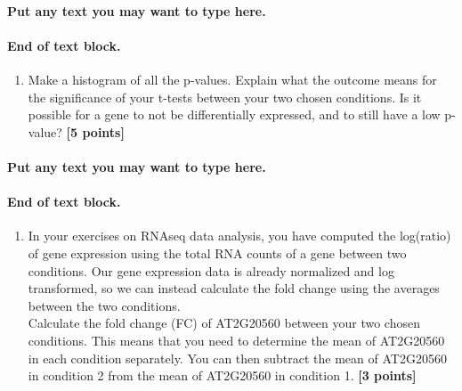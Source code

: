 \documentclass[
]{article}
\providecommand{\tightlist}{%
  \setlength{\itemsep}{0pt}\setlength{\parskip}{0pt}}
\begin{document}
\hypertarget{put-any-text-you-may-want-to-type-here.-6}{%
\paragraph{Put any text you may want to type
here.}\label{put-any-text-you-may-want-to-type-here.-6}}

\hypertarget{end-of-text-block.-8}{%
\paragraph{End of text block.}\label{end-of-text-block.-8}}

\begin{enumerate}
\def\labelenumi{\Alph{enumi})}
\setcounter{enumi}{2}
\tightlist
\item
  Make a histogram of all the p-values. Explain what the outcome means
  for the significance of your t-tests between your two chosen
  conditions. Is it possible for a gene to not be differentially
  expressed, and to still have a low p-value? \textbf{{[}5 points{]}}
\end{enumerate}

\hypertarget{put-any-text-you-may-want-to-type-here.-7}{%
\paragraph{Put any text you may want to type
here.}\label{put-any-text-you-may-want-to-type-here.-7}}

\hypertarget{end-of-text-block.-9}{%
\paragraph{End of text block.}\label{end-of-text-block.-9}}

\begin{enumerate}
\def\labelenumi{\Alph{enumi})}
\setcounter{enumi}{3}
\tightlist
\item
  In your exercises on RNAseq data analysis, you have computed the
  log(ratio) of gene expression using the total RNA counts of a gene
  between two conditions. Our gene expression data is already normalized
  and log transformed, so we can instead calculate the fold change using
  the averages between the two conditions.\\
  Calculate the fold change (FC) of AT2G20560 between your two chosen
  conditions. This means that you need to determine the mean of
  AT2G20560 in each condition separately. You can then subtract the mean
  of AT2G20560 in condition 2 from the mean of AT2G20560 in condition 1.
  \textbf{{[}3 points{]}}
\end{enumerate}
\end{document}
